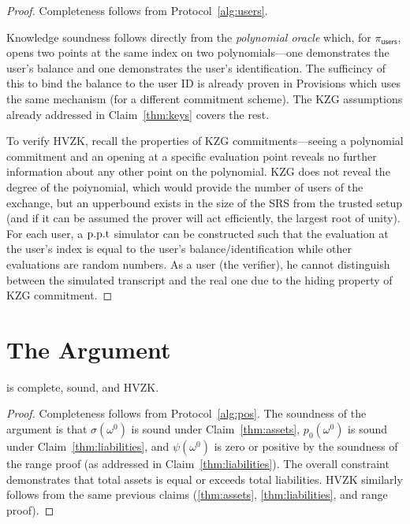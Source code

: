 \begin{proof}
Completeness follows from Protocol~\ref{alg:users}. 

Knowledge soundness follows directly from the \textit{polynomial oracle} which, for $\pi_\mathsf{users}$, opens two points at the same index on two polynomials---one demonstrates the user's balance and one demonstrates the user's identification. The sufficincy of this to bind the balance to the user ID is already proven in Provisions which uses the same mechanism (for a different commitment scheme). The KZG assumptions already addressed in Claim~\ref{thm:keys} covers the rest. 

To verify HVZK, recall the properties of KZG commitments---seeing a polynomial commitment and an opening at a specific evaluation point reveals no further information about any other point on the polynomial. KZG does not reveal the degree of the poiynomial, which would provide the number of users of the exchange, but an upperbound exists in the size of the SRS from the trusted setup (and if it can be assumed the prover will act efficiently, the largest root of unity). For each user, a $\text{p.p.t}$ simulator can be constructed such that the evaluation at the user's index is equal to the user's balance/identification while other evaluations are random numbers. As a user (the verifier), he cannot distinguish between the simulated transcript and the real one due to the hiding property of KZG commitment. \end{proof}


\section{The \pos Argument}

\begin{claim}
\label{thm:solvency} 
\pos is complete, sound, and HVZK. 
\end{claim}

\begin{proof}
Completeness follows from Protocol~\ref{alg:pos}. The soundness of the argument is that $\sigma(\omega^0)$ is sound under Claim~\ref{thm:assets}, $p_0(\omega^0)$ is sound under Claim~\ref{thm:liabilities}, and $\psi(\omega^0)$ is zero or positive by the soundness of the range proof (as addressed in Claim~\ref{thm:liabilities}). The overall constraint demonstrates that total assets is equal or exceeds total liabilities. HVZK similarly follows from the same previous claims (\ref{thm:assets}, \ref{thm:liabilities}, and range proof).\end{proof}

